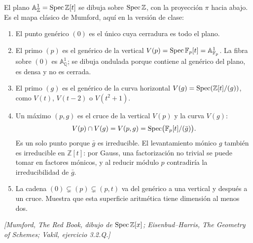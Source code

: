 \begin{obs}
\label{obs:s08-mapa-mumford}
El plano $\mathbb A_{\mathbb Z}^1=\operatorname{Spec}\mathbb Z[t]$ se dibuja sobre $\operatorname{Spec}\mathbb Z$, con la proyección $\pi$ hacia abajo. Es el mapa clásico de Mumford, aquí en la versión de clase:
\begin{enumerate}
\item El punto genérico $(0)$ es el único cuya cerradura es todo el plano.
\item El primo $(p)$ es el genérico de la vertical $V(p)=\operatorname{Spec}\mathbb F_p[t]=\mathbb A_{\mathbb F_p}^1$. La fibra sobre $(0)$ es $\mathbb A_{\mathbb Q}^1$; se dibuja ondulada porque contiene al genérico del plano, es densa y no es cerrada.
\item El primo $(g)$ es el genérico de la curva horizontal $V(g)=\operatorname{Spec}(\mathbb Z[t]/(g))$, como $V(t)$, $V(t-2)$ o $V(t^2+1)$.
\item Un máximo $(p,g)$ es el cruce de la vertical $V(p)$ y la curva $V(g)$:
\[
V(p)\cap V(g)=V(p,g)
=\operatorname{Spec}\bigl(\mathbb F_p[t]/(\bar g)\bigr).
\]
Es un solo punto porque $\bar g$ es irreducible. El levantamiento mónico $g$ también es irreducible en $\mathbb Z[t]$: por Gauss, una factorización no trivial se puede tomar en factores mónicos, y al reducir módulo $p$ contradiría la irreducibilidad de $\bar g$.
\item La cadena $(0)\subsetneq(p)\subsetneq(p,t)$ va del genérico a una vertical y después a un cruce. Muestra que esta superficie aritmética tiene dimensión al menos dos.
\end{enumerate}
\emph{[Mumford, The Red Book, dibujo de $\operatorname{Spec}\mathbb Z[x]$; Eisenbud--Harris, The Geometry of Schemes; Vakil, ejercicio 3.2.Q.]}
\end{obs}

